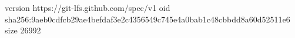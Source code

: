 version https://git-lfs.github.com/spec/v1
oid sha256:9aeb0cdfcb29ae4befdaf3e2c4356549c745e4a0bab1c48cbbdd8a60d52511e6
size 26992
